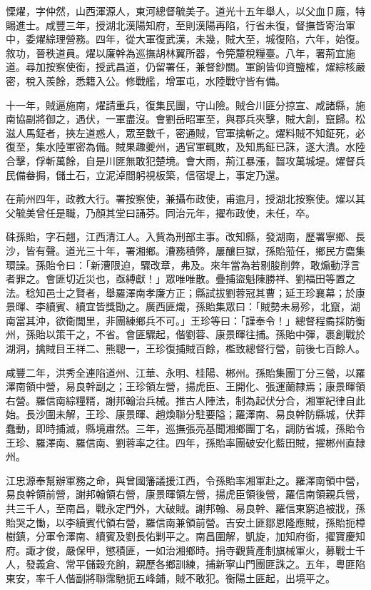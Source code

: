 \begin{pinyinscope}
慄燿，字仲然，山西渾源人，東河總督毓美子。道光十五年舉人，以父血⼙廕，特賜進士。咸豐三年，授湖北漢陽知府，至則漢陽再陷，行省未復，督撫皆寄治軍中，委燿綜理營務。四年，從大軍復武漢，未幾，賊大至，城復陷，六年，始復。敘功，晉秩道員。燿以廉幹為巡撫胡林翼所器，令筦釐稅糧臺。八年，署荊宜施道。尋加按察使銜，授武昌道，仍留署任，兼督鈔關。軍餉皆仰資鹽榷，燿綜核嚴密，稅入羨餘，悉籍入公。修戰艦，增軍屯，水陸戰守皆有備。

十一年，賊逼施南，燿請重兵，復集民團，守山險。賊合川匪分掠宣、咸諸縣，施南協副將御之，遇伏，一軍盡沒。會劉岳昭軍至，與郡兵夾擊，賊大創，竄歸。松滋人馬鉦者，挾左道惑人，眾至數千，密通賊，官軍擒斬之。燿料賊不知鉦死，必復至，集水陸軍密為備。賊果趣夔州，遇官軍輒敗，及知馬鉦已誅，遂大潰。水陸合擊，俘斬萬餘，自是川匪無敢犯楚境。會大雨，荊江暴漲，齧攻萬城堤。燿督兵民備畚挶，儲土石，立泥淖間躬視板築，信宿堤上，事定乃還。

在荊州四年，政教大行。署按察使，兼攝布政使，甫逾月，授湖北按察使。燿以其父毓美曾任是職，乃顏其堂曰誦芬。同治元年，擢布政使，未任，卒。

硃孫貽，字石翹，江西清江人。入貲為刑部主事。改知縣，發湖南，歷署寧鄉、長沙，皆有聲。道光三十年，署湘鄉。漕務積弊，屢釀巨獄，孫貽蒞任，鄉民方麕集環譟。孫貽令曰：「新漕限迫，驟改章，弗及。來年當為若剔朘削弊，敢煽動浮言者罪之。會匪切近災也，亟縛獻！」眾唯唯散。疊捕盜魁陳勝祥、劉福田等置之法。稔知邑士之賢者，舉羅澤南孝廉方正；縣試拔劉蓉冠其曹；延王珍襄幕；於康景暉、李續賓、續宜皆獎勖之。廣西匪熾，孫貽集眾曰：「賊勢未易殄，北竄，湖南當其沖，欲衛閭里，非團練鄉兵不可。」王珍等曰：「謹奉令！」總督程矞採防衡州，孫貽以策干之，不省。會匪驟起，偕劉蓉、康景暉往捕。孫貽中彈，裹創戰於湖洞，擒賊目王祥二、熊聰一，王珍復捕賊百餘，檻致總督行營，前後七百餘人。

咸豐二年，洪秀全連陷道州、江華、永明、桂陽、郴州。孫貽集團丁分三營，以羅澤南領中營，易良幹副之；王珍領左營，揚虎臣、王開化、張運蘭隸焉；康景暉領右營。羅信南綜糧糈，謝邦翰治兵械。推古人陣法，制為起伏分合，湘軍紀律自此始。長沙圍未解，王珍、康景暉、趙煥聯分駐要隘；羅澤南、易良幹防縣城，伏莽蠢動，即時捕滅，縣境肅然。三年，巡撫張亮基聞湘鄉團丁名，調防省城，孫貽令王珍、羅澤南、羅信南、劉蓉率之往。四年，孫貽率團破安化藍田賊，擢郴州直隸州。

江忠源奉幫辦軍務之命，與曾國籓議援江西，令孫貽率湘軍赴之。羅澤南領中營，易良幹領前營，謝邦翰領右營，康景暉領左營，揚虎臣領後營，羅信南領親兵營，共三千人，至南昌，戰永定門外，大破賊。謝邦翰、易良幹、羅信東窮追被戕，孫貽哭之慟，以李續賓代領右營，羅信南兼領前營。吉安土匪鄒恩隆應賊，孫貽扼樟樹鎮，分軍令澤南、續賓及劉長佑剿平之。南昌圍解，凱旋，加知府銜，擢寶慶知府。諏才俊，嚴保甲，懲積匪，一如治湘鄉時。捐寺觀貲產制旗械軍火，募戰士千人，發義倉、常平儲穀充餉，親歷各鄉訓練，捕新寧山門團匪誅之。五年，粵匪陷東安，率千人偕副將聯霈馳扼五峰鋪，賊不敢犯。衡陽土匪起，出境平之。


\end{pinyinscope}
